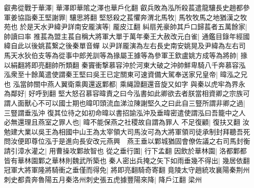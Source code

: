 叡弗從戰于華澤|{
	華澤即華隂之澤也華戶化翻}
叡兵敗為泓所殺萇遣龍驤長史趙都參軍姜協詣秦王堅謝罪|{
	驤思將翻}
堅怒殺之萇懼奔渭北馬牧|{
	馬牧牧馬之地猶漢之牧苑也}
於是天水尹緯尹詳南安龎演等|{
	龎皮江翻}
糾扇羌豪帥其戶口歸萇者五萬餘家|{
	帥讀曰率}
推萇為盟主萇自稱大將軍大單于萬年秦王大赦改元白雀|{
	通鑑目錄年經國緯自此以後姚萇繋之後秦單音蟬}
以尹詳龎演為左右長史南安姚晃及尹緯為左右司馬天水狄伯支等為從事中郎羌訓等為掾屬王據等為參軍王欽盧姚方成等為將帥|{
	掾以絹翻將即亮翻帥所類翻}
秦竇衝撃慕容沖於河東大破之沖帥鮮卑騎八千奔慕容泓泓衆至十餘萬遣使謂秦王堅曰吳王已定關東可速資備大駕奉送家兄皇帝|{
	暐泓之兄也}
泓當帥關中燕人翼衛乘輿還返鄴都|{
	乘䋲證翻還音旋又如字}
與秦以虎牢為界永為鄰好|{
	好呼到翻}
堅大怒召慕容暐責之曰今泓書如此卿欲去者朕當相資卿之宗族可謂人面獸心不可以國士期也暐叩頭流血涕泣陳謝堅久之曰此自三豎所謂非卿之過|{
	三豎謂垂泓沖}
復其位待之如初命暐以書招諭泓沖及垂暐密遣使謂泓曰吾籠中之人必無還理且燕室之罪人也|{
	暐不能保燕之社稷故自謂為罪人}
不足復顧|{
	復扶又翻}
汝勉建大業以吳王為相國中山王為太宰領大司馬汝可為大將軍領司徒承制封拜聽吾死問汝便即尊位泓于是進向長安改元燕興　燕王垂以鄴城猶固會僚佐議之右司馬封衡請引漳水灌之|{
	用曹操攻鄴故智也}
從之垂行圍|{
	行下孟翻}
因飲於華林園|{
	洛都鄴都皆有華林園鄴之華林則魏武所築也}
秦人密出兵掩之矢下如雨垂幾不得出|{
	幾居依翻}
冠軍大將軍隆將騎衝之垂僅而得免|{
	將即亮翻騎奇寄翻}
竟陵太守趙統攻襄陽秦荆州刺史都貴奔魯陽五月秦洛州刺史張五虎據豐陽來降|{
	降戶江翻}
梁州

